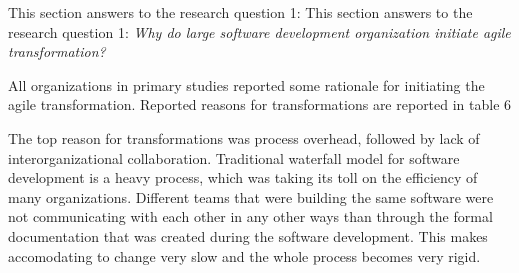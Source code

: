 This section answers to the research question 1: This section answers
to the research question 1: \textit{Why do large software development
organization initiate agile transformation?}

All organizations in primary studies reported some rationale
for initiating the agile transformation. Reported reasons for
transformations are reported in table 6



The top reason for transformations was process overhead, followed by
lack of interorganizational collaboration. Traditional waterfall model
for software development is a heavy process, which was taking its toll
on the efficiency of many organizations. Different teams that were
building the same software were not communicating with each other in any
other ways than through the formal documentation that was created during
the software development. This makes accomodating to change very slow
and the whole process becomes very rigid.
